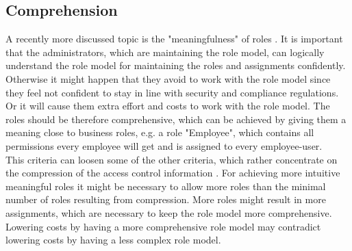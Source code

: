         \subsection{Comprehension}
        A recently more discussed topic is the "meaningfulness" of roles \cite{Xu}\cite{Frank}. It is important that the administrators, which are maintaining the role model, can logically understand the role model for maintaining the roles and assignments confidently. Otherwise it might happen that they avoid to work with the role model since they feel not confident to stay in line with security and compliance regulations. Or it will cause them extra effort and costs to work with the role model. The roles should be therefore comprehensive, which can be achieved by giving them a meaning close to business roles, e.g. a role "Employee", which contains all permissions every employee will get and is assigned to every employee-user.\\
        This criteria can loosen some of the other criteria, which rather concentrate on the compression of the access control information \cite{Frank:2013}. For achieving more intuitive meaningful roles it might be necessary to allow more roles than the minimal number of roles resulting from compression. More roles might result in more assignments, which are necessary to keep the role model more comprehensive. Lowering costs by having a more comprehensive role model may contradict lowering costs by having a less complex role model.
        \iffalse
        In praxis the roles can be often bundled according to the user attributes Internal or External employee, Organizational Unit and Job Function. The pyramid in figure \ref{fig:rolePyramid} demonstrates how easily user-permission assignments can be covered by roles.
        \begin{figure}[H]
            \centering
            \texttt{[image: Role\_Pyramid]}
            \caption{Pyramid of general roles depending on user attributes. Most often roles can be described by the user attributes Internal or External employee, Organizational Unit and Job Function.}
            \label{fig:rolePyramid}
        \end{figure}
        \fi
    
